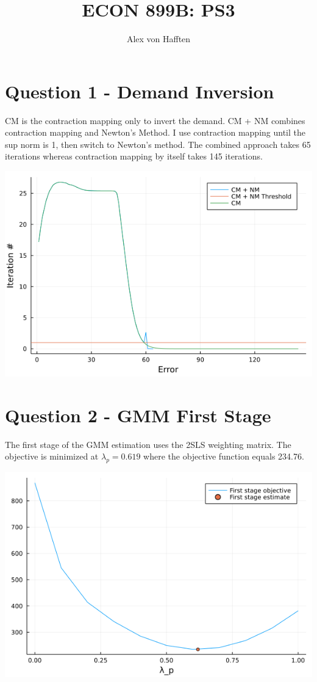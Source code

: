\documentclass{article}
\title{ECON 899B: PS3}
\author{Alex von Hafften}
\begin{document}
\maketitle

\section*{Question 1 - Demand Inversion}

CM is the contraction mapping only to invert the demand.  CM + NM combines contraction mapping and Newton's Method.  I use contraction mapping until the sup norm is 1, then switch to Newton's method.  The combined approach takes 65 iterations whereas contraction mapping by itself takes 145 iterations.

\includegraphics[scale=.75]{question_1.png}

\pagebreak

\section*{Question 2 - GMM First Stage}

The first stage of the GMM estimation uses the 2SLS weighting matrix.  The objective is minimized at $\lambda_p = 0.619$ where the objective function equals 234.76.

\includegraphics[scale=.75]{question_2.png}
\end{document}
